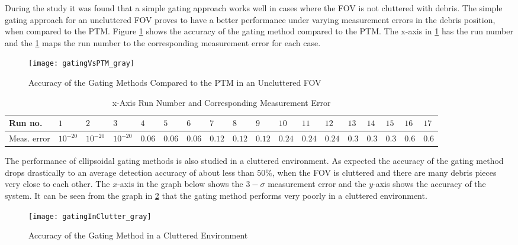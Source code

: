 \documentclass[]{aiaa-tc}%
\begin{document}
During the study it was found that a simple gating approach works well in cases where the FOV is not cluttered with debris. The simple gating approach for an uncluttered FOV proves to have a better performance under varying measurement errors in the debris position, when compared to the PTM. Figure \ref{GatingVsPTM} shows the accuracy of the gating method compared to the PTM. The x-axis in \cref{GatingVsPTM} has the run number and the \cref{map} maps the run number to the corresponding measurement error for each case.\\
\begin{figure}[h]
\centering
\texttt{[image: gatingVsPTM\_gray]}
\caption{Accuracy of the Gating Methods Compared to the PTM in an Uncluttered FOV}
\label{GatingVsPTM}
\end{figure}

\begin{table}
\begin{tabular}[0.4\textwidth]{|p{0.9cm}|p{0.7cm}|p{0.7cm}|p{0.7cm}|p{0.45cm}|p{0.45cm}|p{0.45cm}|p{0.45cm}|p{0.45cm}|p{0.45cm}|p{0.45cm}|p{0.45cm}|p{0.45cm}|p{0.45cm}|p{0.45cm}|p{0.45cm}|p{0.45cm}|p{0.45cm}|}
\hline
Run no. & $1$ & $2$ & $3$ & $4$ & $5$ & $6$ & $7$ & $8$ & $9$ & $10$ & $11$ & $12$ & $13$ & $14$ & $15$ & $16$ & $17$\\
\hline
Meas. error & $10^{-20}$ & $10^{-20}$ & $10^{-20}$ & $0.06$ & $0.06$ & $0.06$ & $0.12$& $0.12$& $0.12$ & $0.24$& $0.24$& $0.24$ & $0.3$ &  $0.3$ & $0.3$ &$0.6$& $0.6$\\
\hline 
\end{tabular}
\caption{x-Axis Run Number and Corresponding Measurement Error}\label{map}
\end{table}

The performance of ellipsoidal gating methods is also studied in a cluttered environment. As expected the accuracy of the gating method drops drastically to an average detection accuracy of about less than $50\%$,  when the FOV is cluttered and there are many debris pieces very close to each other. The $x$-axis in the graph below shows the $3-\sigma$ measurement error and the $y$-axis shows the accuracy of the system. It can be seen from the graph in \cref{gatingInClutter} that the gating method performs very poorly in a cluttered environment.\\

\begin{figure}[h]
\centering
\texttt{[image: gatingInClutter\_gray]}
\caption{Accuracy of the Gating Method in a Cluttered Environment}
\label{gatingInClutter}
\end{figure}
\end{document}
